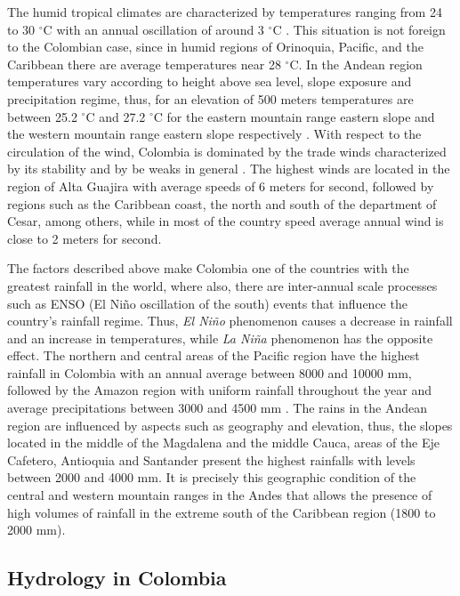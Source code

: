 \documentclass[12pt,halfline,a4paper]{ouparticle}
\begin{document}
The humid tropical climates are characterized by temperatures ranging from 24 to 30 $^\circ$C with an annual oscillation of around 3 $^\circ$C \citep{Latrubesse2005}. This situation is not foreign to the Colombian case, since in humid regions of Orinoquia, Pacific, and the Caribbean there are average temperatures near 28 $^\circ$C. In the Andean region temperatures vary according to height above sea level, slope exposure and precipitation regime, thus, for an elevation of 500 meters temperatures are between 25.2 $^\circ$C and 27.2 $^\circ$C for the eastern mountain range eastern slope and the western mountain range eastern slope respectively \citep{Ideam2_2005}. With respect to the circulation of the wind, Colombia is dominated by the trade winds characterized by its stability and by be weaks in general \citep{Ideam3_2005}. The highest winds are located in the region of Alta Guajira with average speeds of 6 meters for second, followed by regions such as the Caribbean coast, the north and south of the department of Cesar, among others, while in most of the country speed average annual wind is close to 2 meters for second. 

The factors described above make Colombia one of the countries with the greatest rainfall in the world, where also, there are inter-annual scale processes such as ENSO (El Niño oscillation of the south) events that influence the country's rainfall regime. Thus, \textit{El Niño} phenomenon causes a decrease in rainfall and an increase in temperatures, while \textit{La Niña} phenomenon has the opposite effect. The northern and central areas of the Pacific region have the highest rainfall in Colombia with an annual average between 8000 and 10000 mm, followed by the Amazon region with uniform rainfall throughout the year and average precipitations between 3000 and 4500 mm \citep{Ideam4_2005}. The rains in the Andean region are influenced by aspects such as geography and elevation, thus, the slopes located in the middle of the Magdalena and the middle Cauca, areas of the Eje Cafetero, Antioquia and Santander present the highest rainfalls with levels between 2000 and 4000 mm. It is precisely this geographic condition of the central and western   mountain ranges in the Andes that allows the presence of high volumes of rainfall in the extreme south of the Caribbean region (1800 to 2000 mm). 

\subsection{Hydrology in Colombia}
\end{document}
